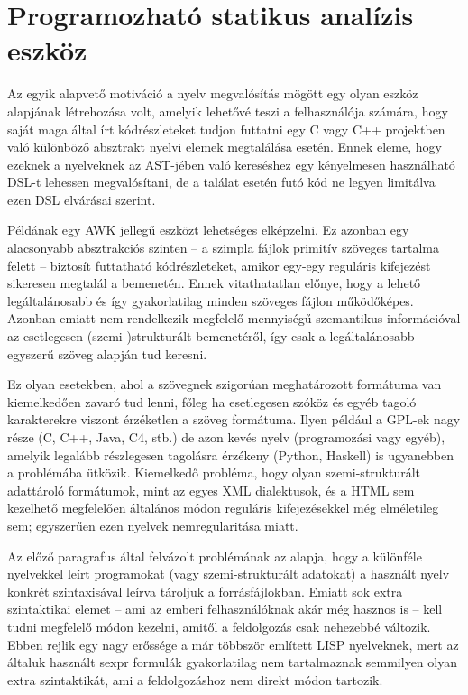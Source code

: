 \section{Programozható statikus analízis eszköz}\label{sec:ftr:blast}

Az egyik alapvető motiváció a nyelv megvalósítás mögött egy olyan eszköz alapjának létrehozása volt, amelyik lehetővé teszi a felhasználója számára, hogy saját maga által írt kódrészleteket tudjon futtatni egy C vagy C++ projektben való különböző absztrakt nyelvi elemek megtalálása esetén.
Ennek eleme, hogy ezeknek a nyelveknek az \gls{AST}-jében való kereséshez egy kényelmesen használható \gls{DSL}-t lehessen megvalósítani, de a találat esetén futó kód ne legyen limitálva ezen \gls{DSL} elvárásai szerint.

Példának egy AWK jellegű eszközt lehetséges elképzelni.
Ez azonban egy alacsonyabb absztrakciós szinten -- a szimpla fájlok primitív szöveges tartalma felett -- biztosít futtatható kódrészleteket, amikor egy-egy reguláris kifejezést sikeresen megtalál a bemenetén.
Ennek vitathatatlan előnye, hogy a lehető legáltalánosabb és így gyakorlatilag minden szöveges fájlon működőképes.
Azonban emiatt nem rendelkezik megfelelő mennyiségű szemantikus információval az esetlegesen (szemi-)strukturált bemenetéről, így csak a legáltalánosabb egyszerű szöveg alapján tud keresni.

Ez olyan esetekben, ahol a szövegnek szigorúan meghatározott formátuma van kiemelkedően zavaró tud lenni, főleg ha esetlegesen szóköz és egyéb tagoló karakterekre viszont érzéketlen a szöveg formátuma.
Ilyen például a \gls{GPL}-ek nagy része (\pl C, C++, Java, C4, stb.) de azon kevés nyelv (programozási vagy egyéb), amelyik legalább részlegesen tagolásra érzékeny (\pl Python, Haskell) is ugyanebben a problémába ütközik.
Kiemelkedő probléma, hogy olyan szemi-strukturált adattároló formátumok, mint az egyes \gls{XML} dialektusok, és a \gls{HTML} sem kezelhető megfelelően általános módon reguláris kifejezésekkel még elméletileg sem; egyszerűen ezen nyelvek nemregularitása miatt.

Az előző paragrafus által felvázolt problémának az alapja, hogy a különféle nyelvekkel leírt programokat (vagy szemi-strukturált adatokat) a használt nyelv konkrét szintaxisával leírva tároljuk a forrásfájlokban.
Emiatt sok extra szintaktikai elemet -- ami az emberi felhasználóknak akár még hasznos is -- kell tudni megfelelő módon kezelni, amitől a feldolgozás csak nehezebbé változik.
Ebben rejlik egy nagy erőssége a már többször említett LISP nyelveknek, mert az általuk használt \gls{sexpr} formulák gyakorlatilag nem tartalmaznak semmilyen olyan extra szintaktikát, ami a feldolgozáshoz nem direkt módon tartozik.

